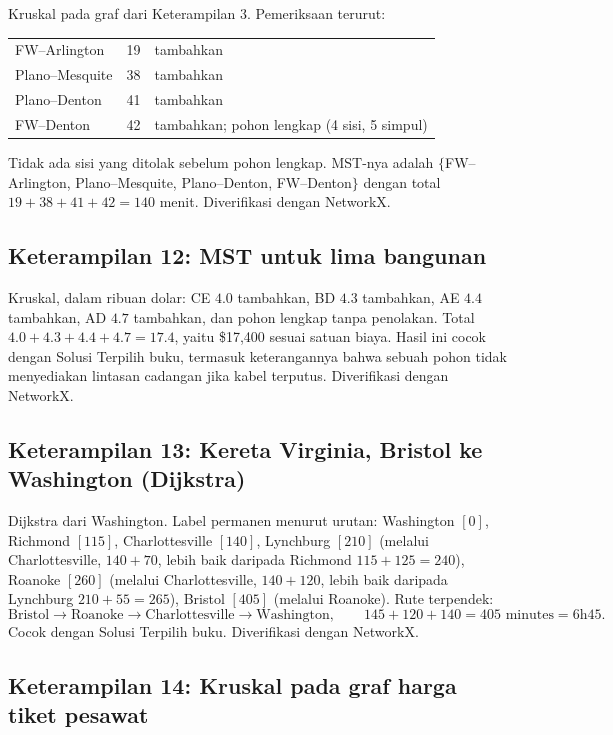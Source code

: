 Kruskal pada graf dari Keterampilan 3. Pemeriksaan terurut:
\begin{center}
\begin{tabular}{lll}
FW--Arlington & 19 & tambahkan \\
Plano--Mesquite & 38 & tambahkan \\
Plano--Denton & 41 & tambahkan \\
FW--Denton & 42 & tambahkan; pohon lengkap (4 sisi, 5 simpul) \\
\end{tabular}
\end{center}
Tidak ada sisi yang ditolak sebelum pohon lengkap. MST-nya adalah $\{$FW--Arlington, Plano--Mesquite, Plano--Denton, FW--Denton$\}$ dengan total $19 + 38 + 41 + 42 = 140$ menit. Diverifikasi dengan NetworkX.

\subsection*{Keterampilan 12: MST untuk lima bangunan}

Kruskal, dalam ribuan dolar: CE $4.0$ tambahkan, BD $4.3$ tambahkan, AE $4.4$ tambahkan, AD $4.7$ tambahkan, dan pohon lengkap tanpa penolakan. Total $4.0 + 4.3 + 4.4 + 4.7 = 17.4$, yaitu \$17{,}400 sesuai satuan biaya. Hasil ini cocok dengan Solusi Terpilih buku, termasuk keterangannya bahwa sebuah pohon tidak menyediakan lintasan cadangan jika kabel terputus. Diverifikasi dengan NetworkX.

\subsection*{Keterampilan 13: Kereta Virginia, Bristol ke Washington (Dijkstra)}

Dijkstra dari Washington. Label permanen menurut urutan: Washington $[0]$, Richmond $[115]$, Charlottesville $[140]$, Lynchburg $[210]$ (melalui Charlottesville, $140+70$, lebih baik daripada Richmond $115+125 = 240$), Roanoke $[260]$ (melalui Charlottesville, $140+120$, lebih baik daripada Lynchburg $210+55 = 265$), Bristol $[405]$ (melalui Roanoke). Rute terpendek:
\[
\text{Bristol} \to \text{Roanoke} \to \text{Charlottesville} \to \text{Washington},
\qquad 145 + 120 + 140 = 405 \text{ minutes} = 6\text{h}45.
\]
Cocok dengan Solusi Terpilih buku. Diverifikasi dengan NetworkX.

\subsection*{Keterampilan 14: Kruskal pada graf harga tiket pesawat}

